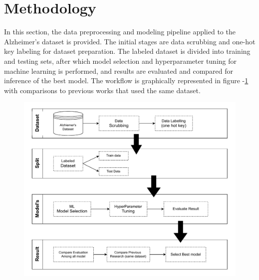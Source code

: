 \documentclass[conference]{IEEEtran} %
\begin{document}
\section{Methodology}
In this section, the data preprocessing and modeling pipeline applied to the Alzheimer's dataset is provided. The initial stages are data scrubbing and one-hot key labeling for dataset preparation. The labeled dataset is divided into training and testing sets, after which model selection and hyperparameter tuning for machine learning is performed, and results are evaluated and compared for inference of the best model. The workflow is graphically represented in figure -\ref{fig:00} with comparisons to previous works that used the same dataset.
\begin{figure}[ht]
    \centering
    \includegraphics[width=\linewidth]{Fig-00.pdf}
    \caption{}
    \label{fig:00}
\end{figure}
\FloatBarrier
\end{document}

